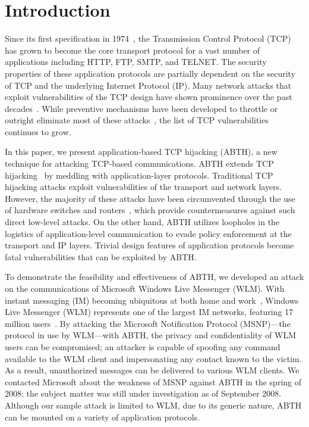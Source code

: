 \documentclass{sig-alternate}
\begin{document}

\section{Introduction}

Since its first specification in 1974~\cite{rfc:tcp}, the Transmission Control Protocol (TCP) has grown to become the core transport protocol for a vast number of applications including HTTP, FTP, SMTP, and TELNET.
The security properties of these application protocols are partially dependent on the security of TCP and the underlying Internet Protocol (IP).
Many network attacks that exploit vulnerabilities of the TCP design have shown prominence over the past decades~\cite{harris:tcpattacks}.
While preventive mechanisms have been developed to throttle or outright eliminate most of these attacks~\cite{dubrawsky:layer2}, the list of TCP vulnerabilities continues to grow.

In this paper, we present application-based TCP hijacking (ABTH), a new technique for attacking TCP-based communications.
ABTH extends TCP hijacking~\cite{stamp:infosec} by meddling with application-layer protocols.
Traditional TCP hijacking attacks exploit vulnerabilities of the transport and network layers.
However, the majority of these attacks have been circumvented through the use of hardware switches and routers~\cite{dubrawsky:layer2}, which provide countermeasures against such direct low-level attacks.
On the other hand, ABTH utilizes loopholes in the logistics of application-level communication to evade policy enforcement at the transport and IP layers.
Trivial design features of application protocols become fatal vulnerabilities that can be exploited by ABTH.

\begin{sloppypar}
To demonstrate the feasibility and effectiveness of ABTH, we developed an attack on the communications of Microsoft Windows Live Messenger (WLM).
With instant messaging (IM) becoming ubiquitous at both home and work~\cite{aol:survey}, Windows Live Messenger (WLM) represents one of the largest IM networks, featuring 17 million users~\cite{microsoft:advertising}.
By attacking the Microsoft Notification Protocol (MSNP)---the protocol in use by WLM---with ABTH, the privacy and confidentiality of WLM users can be compromised; an attacker is capable of spoofing any command available to the WLM client and impersonating any contact known to the victim.
As a result, unauthorized messages can be delivered to various WLM clients.
We contacted Microsoft about the weakness of MSNP against ABTH in the spring of 2008; the subject matter was still under investigation as of September 2008.
Although our sample attack is limited to WLM, due to its generic nature, ABTH can be mounted on a variety of application protocols.
\end{sloppypar}
\end{document}
